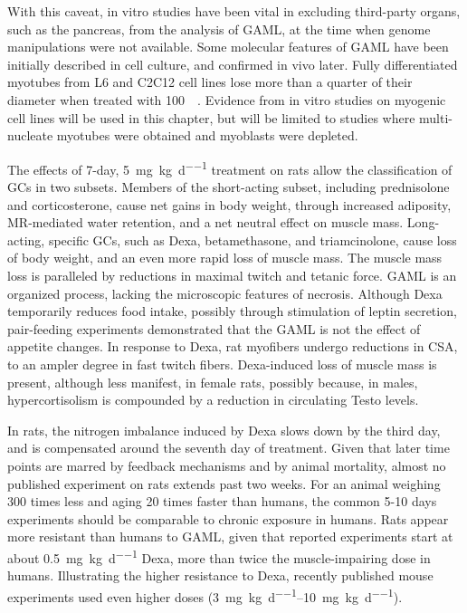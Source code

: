 \documentclass[12pt,english]{report}\usepackage[]{graphicx}\usepackage[]{color}
\begin{document}
With this caveat, in vitro studies have been vital in excluding third-party
organs, such as the pancreas, from the analysis of GAML, at the time
when genome manipulations were not available. Some molecular features
of GAML have been initially described in cell culture, and confirmed
in vivo later. Fully differentiated myotubes from L6 and C2C12 cell
lines lose more than a quarter of their diameter when treated with
\SI{100}{\nano\molar}\citep{menconi2008dexamethasone}. Evidence
from in vitro studies on myogenic cell lines will be used in this
chapter, but will be limited to studies where multi-nucleate myotubes
were obtained and myoblasts were depleted.

The effects of 7-day, \SI{5}{\milli\gram\per\kilo\gram\per\day} treatment
on rats allow the classification of GCs in two subsets\citep{bullock1972relative}.
Members of the short-acting subset, including prednisolone and corticosterone,
cause net gains in body weight, through increased adiposity, MR-mediated
water retention, and a net neutral effect on muscle mass. Long-acting,
specific GCs, such as Dexa, betamethasone, and triamcinolone, cause
loss of body weight, and an even more rapid loss of muscle mass. The
muscle mass loss is paralleled by reductions in maximal twitch and
tetanic force\citep{alamdari2012loss}. GAML is an organized process,
lacking the microscopic features of necrosis\citep*{nava1996effects}.
Although Dexa temporarily reduces food intake, possibly through stimulation
of leptin secretion\citep{caldefie-chezet2001dexamethasone}, pair-feeding
experiments demonstrated that the GAML is not the effect of appetite
changes\citep{dardevet1995sensitivity,nicastro2012effectsa}. In response
to Dexa, rat myofibers undergo reductions in CSA, to an ampler degree
in fast twitch fibers\citep{prezant1997gender-specific,baptista2013leucine}.
Dexa-induced loss of muscle mass is present, although less manifest,
in female rats, possibly because, in males, hypercortisolism is compounded
by a reduction in circulating Testo levels\citep{prezant1997gender-specific}.

In rats, the nitrogen imbalance induced by Dexa slows down by the
third day, and is compensated around the seventh day of treatment\citep{minet-quinard2000induction,bowes1996effect}.
Given that later time points are marred by feedback mechanisms and
by animal mortality, almost no published experiment on rats extends
past two weeks. For an animal weighing 300 times less and aging 20
times faster than humans, the common 5-10 days experiments should
be comparable to chronic exposure in humans. Rats appear more resistant
than humans to GAML, given that reported experiments start at about
\SI{0.5}{\milli\gram\per\kilo\gram\per\day} Dexa, more than twice
the muscle-impairing dose in humans. Illustrating the higher resistance
to Dexa, recently published mouse experiments used even higher doses
(\SIrange{3}{10}{\milli\gram\per\kilo\gram\per\day}\citep{furlow2013altered,son2015dexamethasone}).
\end{document}

